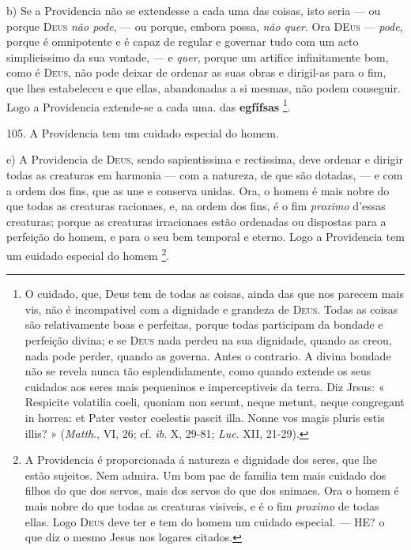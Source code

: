 b) Se a Providencia não se extendesse a cada uma das coisas, isto seria --- ou porque \textsc{Deus} \emph{não pode}, --- ou porque, embora possa, \emph{não quer}. Ora \textsc{DEus} --- \emph{pode}, porque é omnipotente e é capaz de regular e governar tudo com um acto simplieissimo da sua vontade, --- e \emph{quer}, porque um artifice infinitamente bom, como é \textsc{Deus}, não pode deixar de ordenar as suas obras e dirigil-as para o fim, que lhes estabeleceu e que ellas, abandonadas a si mesmas, não podem conseguir. Logo a Providencia extende-se a cada uma. das \textbf{egfífsas} \footnote{O cuidado, que, Deus tem de todas as coisas, ainda das que nos parecem mais vis, não é incompativel com a dignidade e grandeza de \textsc{Deus}. Todas as coisas são relativamente boas e perfeitas, porque todas participam da bondade e perfeição divina; e se \textsc{Deus} nada perdeu na sua dignidade, quando as creou, nada pode perder, quando as governa. Antes o contrario. A divina bondade não se revela nunca tão esplendidamente, como quando extende os seus cuidados aos seres mais pequeninos e imperceptiveis da terra. Diz Jrsus: « Respicite volatilia coeli, quoniam non serunt, neque metunt, neque congregant in horrea: et Pater vester coelestis pascit illa. Nonne vos magis pluris estis illis? » (\emph{Matth}., VI, 26; cf. \emph{ib}. X, 29-81; \emph{Luc}. XII, 21-29).}.

105. A Providencia tem um cuidado especial do homem.

e) A Providencia de \textsc{Deus}, sendo sapientissima e rectissima, deve ordenar e dirigir todas as creaturas em harmonia --- com a natureza, de que são dotadas, --- e com a ordem dos fins,   que as une e conserva unidas. Ora, o homem é mais nobre do que todas as creaturas racionaes, e, na ordem dos fins, é o fim \emph{proximo} d'essas creaturas; porque as creaturas irracionaes estão ordenadas ou dispostas para a perfeição do homem, e para o seu bem temporal e eterno. Logo a Providencia tem um euidado especial do homem \footnote{A Providencia é proporcionada á natureza e dignidade dos seres, que lhe estão sujeitos. Nem admira. Um bom pae de familia tem mais cuidado dos filhos do que dos servos, mais dos servos do que dos snimaes. Ora o homem é mais nobre do que todas as creaturas visiveis, e é o fim \emph{proximo} de todas ellas. Logo \textsc{Deus} deve ter e tem do homem um cuidado especial. --- HE? o que diz o mesmo Jesus nos logares citados.}.

